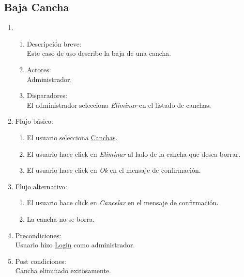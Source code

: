 \documentclass[a4paper,11pt]{article}
\begin{document}
\subsection{Baja Cancha}
\begin{enumerate}

    \item
    	\begin{enumerate}
    		\item Descripci\'on breve: \\
        		Este caso de uso describe la baja de una cancha.
    		\item Actores: \\
        		Administrador.
	    	\item Disparadores: \\
        		El administrador selecciona \emph{Eliminar} en el listado de canchas.
    	\end{enumerate} 
    \item Flujo b\'asico:
		\begin{enumerate}
        		\item El usuario selecciona \underline{Canchas}.
                        \item El usuario hace click en \emph{Eliminar} al lado de la cancha que desea borrar.
			\item El usuario hace click en \emph{Ok} en el mensaje de confirmaci\'on.
		\end{enumerate}
    \item Flujo alternativo:
		\begin{enumerate}
		 \item El usuario hace click en \emph{Cancelar} en el mensaje de confirmaci\'on.
		 \item La cancha no se borra.
		\end{enumerate}
    \item Precondiciones: \\
        Usuario hizo \underline{Login} como administrador.
    \item Post condiciones: \\
        Cancha eliminado exitosamente.
\end{enumerate}


\end{document}
